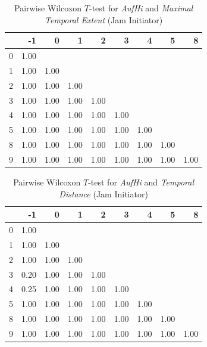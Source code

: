     \begin{table}[ht!]
        \tiny
        \centering
        \begin{tabular}{rrrrrrrrr}
            \toprule
              & -1 & 0 & 1 & 2 & 3 & 4 & 5 & 8 \\
            \midrule
            0 & 1.00 &  &  &  &  &  &  &  \\ 
            1 & 1.00 & 1.00 &  &  &  &  &  &  \\ 
            2 & 1.00 & 1.00 & 1.00 &  &  &  &  &  \\ 
            3 & 1.00 & 1.00 & 1.00 & 1.00 &  &  &  &  \\ 
            4 & 1.00 & 1.00 & 1.00 & 1.00 & 1.00 &  &  &  \\ 
            5 & 1.00 & 1.00 & 1.00 & 1.00 & 1.00 & 1.00 &  &  \\ 
            8 & 1.00 & 1.00 & 1.00 & 1.00 & 1.00 & 1.00 & 1.00 &  \\ 
            9 & 1.00 & 1.00 & 1.00 & 1.00 & 1.00 & 1.00 & 1.00 & 1.00 \\ 
            \bottomrule
        \end{tabular}
        \caption{Pairwise Wilcoxon $T$-test for \textit{AufHi} and \textit{Maximal Temporal Extent} (Jam Initiator)}
        \label{tbl:wilcoxon_baysis_initiator_AufHi_TMax}
    \end{table}

    \begin{table}[ht!]
        \tiny
        \centering
        \begin{tabular}{rrrrrrrrr}
            \toprule
              & -1 & 0 & 1 & 2 & 3 & 4 & 5 & 8 \\ 
            \midrule
            0 & 1.00 &  &  &  &  &  &  &  \\ 
            1 & 1.00 & 1.00 &  &  &  &  &  &  \\ 
            2 & 1.00 & 1.00 & 1.00 &  &  &  &  &  \\ 
            3 & 0.20 & 1.00 & 1.00 & 1.00 &  &  &  &  \\ 
            4 & 0.25 & 1.00 & 1.00 & 1.00 & 1.00 &  &  &  \\ 
            5 & 1.00 & 1.00 & 1.00 & 1.00 & 1.00 & 1.00 &  &  \\ 
            8 & 1.00 & 1.00 & 1.00 & 1.00 & 1.00 & 1.00 & 1.00 &  \\ 
            9 & 1.00 & 1.00 & 1.00 & 1.00 & 1.00 & 1.00 & 1.00 & 1.00 \\ 
            \bottomrule
        \end{tabular}
        \caption{Pairwise Wilcoxon $T$-test for \textit{AufHi} and \textit{Temporal Distance} (Jam Initiator)}
        \label{tbl:wilcoxon_baysis_initiator_AufHi_TDist}
    \end{table}

